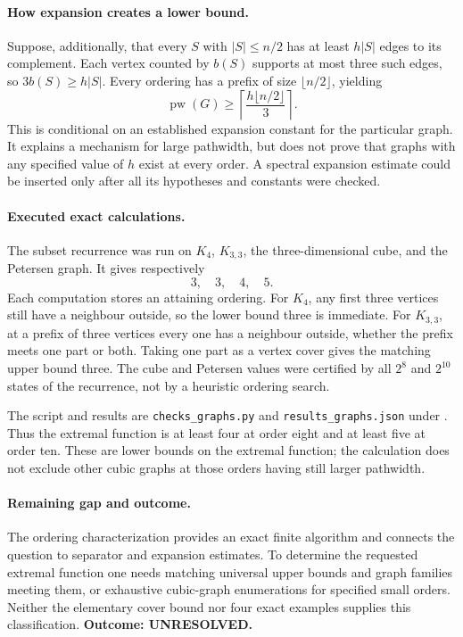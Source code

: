 \documentclass[11pt,a4paper]{article}
\begin{document}
\paragraph{How expansion creates a lower bound.}
Suppose, additionally, that every $S$ with $|S|\le n/2$ has at least
$h|S|$ edges to its complement. Each vertex counted by $b(S)$
supports at most three such edges, so $3b(S)\ge h|S|$.
Every ordering has a prefix of size $\lfloor n/2\rfloor$, yielding
\[
             \operatorname{pw}(G)\ge
             \left\lceil\frac{h\lfloor n/2\rfloor}{3}\right\rceil.
\]
This is conditional on an established expansion constant for the
particular graph. It explains a mechanism for large pathwidth, but
does not prove that graphs with any specified value of $h$ exist at
every order. A spectral expansion estimate could be inserted only
after all its hypotheses and constants were checked.

\paragraph{Executed exact calculations.}
The subset recurrence was run on $K_4$, $K_{3,3}$, the three-dimensional
cube, and the Petersen graph. It gives respectively
\[
                         3,\quad3,\quad4,\quad5.
\]
Each computation stores an attaining ordering. For $K_4$, any first
three vertices still have a neighbour outside, so the lower bound three
is immediate. For $K_{3,3}$, at a prefix of three vertices every one
has a neighbour outside, whether the prefix meets one part or both.
Taking one part as a vertex cover gives the matching upper bound three.
The cube and Petersen values were certified by all $2^8$ and $2^{10}$
states of the recurrence, not by a heuristic ordering search.

The script and results are \texttt{checks\_graphs.py} and
\texttt{results\_graphs.json} under
.
Thus the extremal function is at least four at order eight and at
least five at order ten. These are lower bounds on the extremal
function; the calculation does not exclude other cubic graphs at
those orders having still larger pathwidth.

\paragraph{Remaining gap and outcome.}
The ordering characterization provides an exact finite algorithm and
connects the question to separator and expansion estimates. To determine
the requested extremal function one needs matching universal upper
bounds and graph families meeting them, or exhaustive cubic-graph
enumerations for specified small orders. Neither the elementary cover
bound nor four exact examples supplies this classification.
\textbf{Outcome: UNRESOLVED.}
\end{document}
